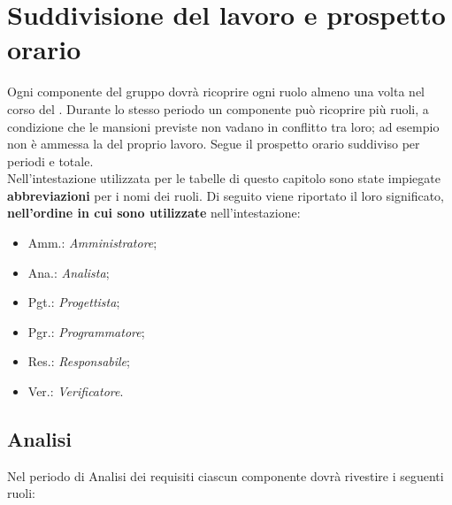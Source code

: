 \section{Suddivisione del lavoro e prospetto orario}
Ogni componente del gruppo dovrà ricoprire ogni ruolo almeno una volta nel corso del .
Durante lo stesso periodo un componente può ricoprire più ruoli, a condizione che le mansioni previste non vadano in conflitto tra loro; ad esempio non è ammessa la  del proprio lavoro.
Segue il prospetto orario suddiviso per periodi e totale. \\

Nell'intestazione utilizzata per le tabelle di questo capitolo sono state impiegate \textbf{abbreviazioni} per i nomi dei ruoli.
Di seguito viene riportato il loro significato, \textbf{nell'ordine in cui sono utilizzate} nell'intestazione:
\begin{itemize}
\item Amm.: \textit{Amministratore};
\item Ana.: \textit{Analista};
\item Pgt.: \textit{Progettista};
\item Pgr.: \textit{Programmatore};
\item Res.: \textit{Responsabile};
\item Ver.: \textit{Verificatore}.
\end{itemize}

\pagebreak
\subsection{Analisi}
Nel periodo di Analisi dei requisiti ciascun componente dovrà rivestire i seguenti ruoli:

